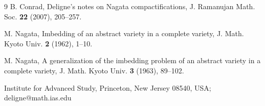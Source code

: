 \documentclass[11pt,a4paper]{article}
\theoremstyle{plain}
\theoremstyle{definition}
\begin{document}
\begin{thebibliography}{9}
B. Conrad, Deligne's notes on Nagata compactifications, J. Ramanujan Math. Soc. \textbf{22} (2007), 205--257.

M. Nagata, Imbedding of an abstract variety in a complete variety, J. Math. Kyoto Univ. \textbf{2} (1962), 1--10.

M. Nagata, A generalization of the imbedding problem of an abstract variety in a complete variety, J. Math. Kyoto Univ. \textbf{3} (1963), 89--102.
\end{thebibliography}

\bigskip
\noindent Institute for Advanced Study, Princeton, New Jersey 08540, USA;
deligne@math.ias.edu
\end{document}
